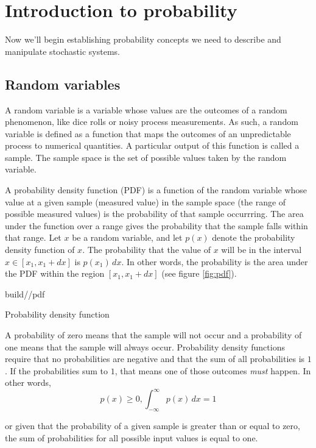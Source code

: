 \section{Introduction to probability}

Now we'll begin establishing probability concepts we need to describe and
manipulate stochastic systems.

\subsection{Random variables}

A random variable is a variable whose values are the outcomes of a random
phenomenon, like dice rolls or noisy process measurements. As such, a random
variable is defined as a function that maps the outcomes of an unpredictable
process to numerical quantities. A particular output of this function is called
a sample. The sample space is the set of possible values taken by the random
variable.

A probability density function (PDF) is a function of the random variable whose
value at a given sample (measured value) in the sample space (the range of
possible measured values) is the probability of that sample occurrring. The area
under the function over a range gives the probability that the sample falls
within that range. Let $x$ be a random variable, and let $p(x)$ denote the
probability density function of $x$. The probability that the value of $x$ will
be in the interval $x \in [x_1, x_1 + dx]$ is $p(x_1) \,dx$. In other words, the
probability is the area under the PDF within the region $[x_1, x_1 + dx]$ (see
figure \ref{fig:pdf}).
\begin{svg}{build/\chapterpath/pdf}
  \caption{Probability density function}
  \label{fig:pdf}
\end{svg}

A probability of zero means that the sample will not occur and a probability of
one means that the sample will always occur. Probability density functions
require that no probabilities are negative and that the sum of all probabilities
is $1$. If the probabilities sum to $1$, that means one of those outcomes
\textit{must} happen. In other words,
\begin{equation*}
  p(x) \geq 0, \int_{-\infty}^\infty p(x) \,dx = 1
\end{equation*}

or given that the probability of a given sample is greater than or equal to
zero, the sum of probabilities for all possible input values is equal to one.

